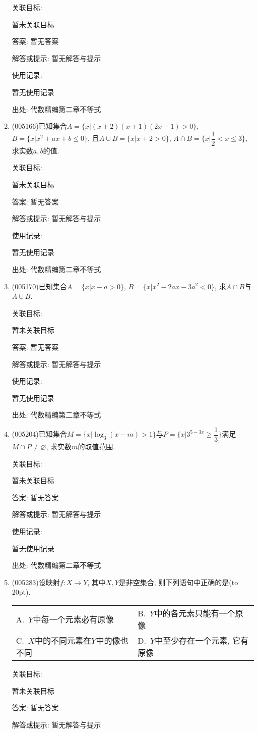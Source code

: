 \documentclass[10pt,a4paper]{article}
\newcommand{\bracket}[1]{(\hbox to #1pt{})}
\newcommand{\twoch}[4]{\par\begin{tabular}{p{.46\textwidth}p{.46\textwidth}}
A.~#1& B.~#2\\
C.~#3& D.~#4
\end{tabular}}
\begin{document}
\begin{enumerate}[1.]
关联目标:

暂未关联目标

答案: 暂无答案

解答或提示: 暂无解答与提示

使用记录:

暂无使用记录


出处: 代数精编第二章不等式
\item { (005166)}已知集合$A=\{x|(x+2)(x+1)(2x-1)>0\}$, $B=\{x|x^2+ax+b\le 0\}$, 且$A\cup B=\{x|x+2 >0\}$, $A\cap B=\{x|\dfrac 12<x\le 3\}$, 求实数$a,b$的值.


关联目标:

暂未关联目标

答案: 暂无答案

解答或提示: 暂无解答与提示

使用记录:

暂无使用记录


出处: 代数精编第二章不等式
\item { (005170)}已知集合$A=\{x|x-a>0\}$, $B=\{x|x^2-2ax-3a^2<0\}$, 求$A\cap B$与$A\cup B$.


关联目标:

暂未关联目标

答案: 暂无答案

解答或提示: 暂无解答与提示

使用记录:

暂无使用记录


出处: 代数精编第二章不等式
\item { (005204)}已知集合$M=\{x|\log_3(x-m)>1\}$与$P=\{x|3^{5-3x} \ge \dfrac 13\}$满足$M\cap P\ne \varnothing$, 求实数$m$的取值范围.


关联目标:

暂未关联目标

答案: 暂无答案

解答或提示: 暂无解答与提示

使用记录:

暂无使用记录


出处: 代数精编第二章不等式
\item { (005283)}设映射$f:X\to Y$, 其中$X,Y$是非空集合, 则下列语句中正确的是\bracket{20}.
\twoch{$Y$中每一个元素必有原像}{$Y$中的各元素只能有一个原像}{$X$中的不同元素在$Y$中的像也不同}{$Y$中至少存在一个元素, 它有原像}


关联目标:

暂未关联目标

答案: 暂无答案

解答或提示: 暂无解答与提示


\end{enumerate}
\end{document}
